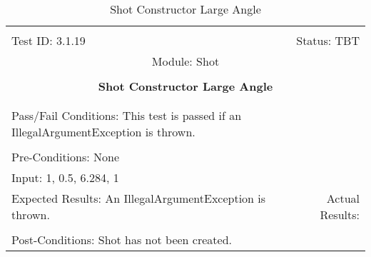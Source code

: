 \documentclass[titlepage]{article}
\begin{document}
\begin{center}%
\begin{table}
\begin{tabular}{|l r|}\hline&\\[-2mm]
	Test ID: 3.1.19	&Status: TBT\\[-3mm]
	\multicolumn{2}{|c|}{Module: Shot}\\&\\
	\multicolumn{2}{|c|}{\textbf{\large{Shot Constructor Large Angle}}}\\&\\\hline&\\[-3mm]
	\multicolumn{2}{|p{\textwidth}|}{Pass/Fail Conditions: This test is passed if an IllegalArgumentException is thrown.}\\[1mm]\hline&\\[-3mm]
	\multicolumn{2}{|p{\textwidth}|}{Pre-Conditions: None}\\[4mm]
	\multicolumn{2}{|p{\textwidth}|}{Input: 1, 0.5, 6.284, 1}\\[2mm]\hline
	\multicolumn{1}{|p{0.49\textwidth}}{Expected Results: An IllegalArgumentException is thrown.}	&\multicolumn{1}{|p{0.45\textwidth}|}{Actual Results: }\\\hline&\\[-3mm]
	\multicolumn{2}{|p{\textwidth}|}{Post-Conditions: Shot has not been created.}\\\hline
\end{tabular}
\caption{Shot Constructor Large Angle}
\end{table}
\end{center}
\end{document}
